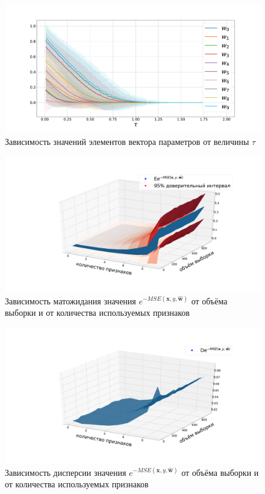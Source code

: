 \documentclass[12pt,twoside]{article}
\begin{document}
\begin{figure}[h!t]\center
\includegraphics[width=1\textwidth]{../data/pics/synthetic_lasso_W.pdf}
\caption{Зависимость значений элементов вектора параметров от величины $\tau$}
\label{fig6}
\end{figure}

\begin{figure}[h!t]\center
\includegraphics[width=1\textwidth]{../data/pics/synthetic_MSE_surface.pdf}
\caption{Зависимость матожидания значения $e^{-MSE(\mathbf{x}, y, \hat{\mathbf{w}})}$ от объёма выборки и от количества используемых признаков}
\label{fig7}
\end{figure}

\begin{figure}[h!t]\center
\includegraphics[width=1\textwidth]{../data/pics/synthetic_MSE_std_surface.pdf}
\caption{Зависимость дисперсии значения $e^{-MSE(\mathbf{x}, y, \hat{\mathbf{w}})}$ от объёма выборки и от количества используемых признаков}
\label{fig8}
\end{figure}
\end{document}
